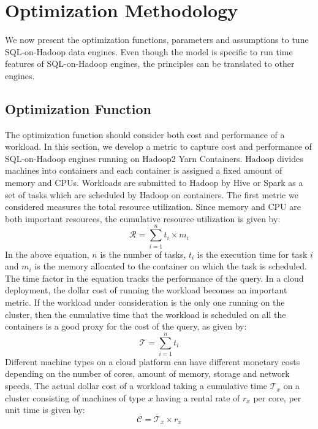 \section{Optimization Methodology}
\label{sec:optmethod}
We now present the optimization functions, parameters and assumptions to tune SQL-on-Hadoop data engines. Even though the model is specific to run time features of SQL-on-Hadoop engines, the principles can be translated to other engines. 

\subsection{Optimization Function}
The optimization function should consider both cost and performance of a workload. In this section, we develop a metric to capture cost and performance of SQL-on-Hadoop engines running on Hadoop2 Yarn Containers. Hadoop divides machines into containers and each container is assigned a fixed amount of memory and CPUs. Workloads are submitted to Hadoop by Hive or Spark as a set of tasks which are scheduled by Hadoop on containers. The first metric we considered measures the total resource utilization. Since memory and CPU are both important resources, the cumulative resource utilization is given by:
\begin{equation}
\label{eqn:totalresource}
\mathcal{R} = \sum_{i=1}^{n} t_i \times m_i
\end{equation}
In the above equation, $n$ is the number of tasks, $t_i$ is the execution time for task $i$ and $m_i$ is the memory allocated to the container on which the task is scheduled. The time factor in the equation tracks the performance of the query. In a cloud deployment, the dollar cost of running the workload becomes an important metric. If the workload under consideration is the only one running on the cluster, then the cumulative time that the workload is scheduled on all the containers is a good proxy for the cost of the query, as given by:
\begin{equation}
\label{eqn:totaltime}
\mathcal{T} = \sum_{i=1}^{n} t_i
\end{equation}
Different machine types on a cloud platform can have different monetary costs depending on the number of cores, amount of memory, storage and network speeds. The actual dollar cost of a workload taking a cumulative time $\mathcal{T}_x$ on a cluster consisting of machines of type $x$ having a rental rate of $r_x$ per core, per unit time is given by:
\begin{equation}
\label{eqn:totalcost}
\mathcal{C} = \mathcal{T}_x \times r_x
\end{equation}


